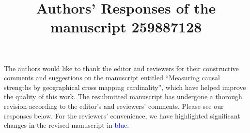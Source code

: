 \documentclass[11pt]{article}
\title{Authors' Responses of the manuscript 259887128}
\author{}
\date{}
\newcounter{reviewer}
\begin{document}
\maketitle

\vspace{-30pt}

The authors would like to thank the editor and reviewers for their constructive comments and suggestions on the manuscript entitled “Measuring causal strengths by geographical cross mapping cardinality”, which have helped improve the quality of this work. The resubmitted manuscript has undergone a thorough revision according to the editor’s and reviewers’ comments. Please see our responses below. For the reviewers’ convenience, we have highlighted significant changes in the revised manuscript in \textcolor{blue}{blue}.
\end{document}
